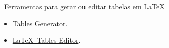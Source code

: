\begin{frame}
\begin{columns}[t]
\begin{alertblock}{\faInfoCircle\ Ferramentas para gerar ou editar tabelas em \LaTeX}
			\begin{itemize}
				\item[\tiny\faTools] \href{https://www.tablesgenerator.com/}{Tables Generator\LinkIcon}.
				\item[\tiny\faTools] \href{https://www.latex-tables.com/}{\LaTeX\ Tables Editor\LinkIcon}.
			\end{itemize}
			
		\end{alertblock}
		
	\end{columns}
	
\end{frame}
